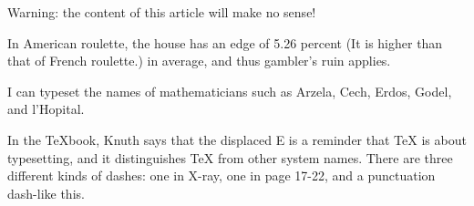 Warning: the content of this article will make no sense!

In American roulette, the house has an edge of 5.26 percent
(It is higher than that of French roulette.) in average,
and thus gambler's ruin applies.

I can typeset the names of mathematicians such as Arzela, Cech, Erdos,
Godel, and l'Hopital.

In the TeXbook, Knuth says that the displaced E is a reminder that TeX
is about typesetting, and it distinguishes TeX from other system names.
There are three different kinds of dashes: one in X-ray, one in page 17-22,
and a punctuation dash-like this.